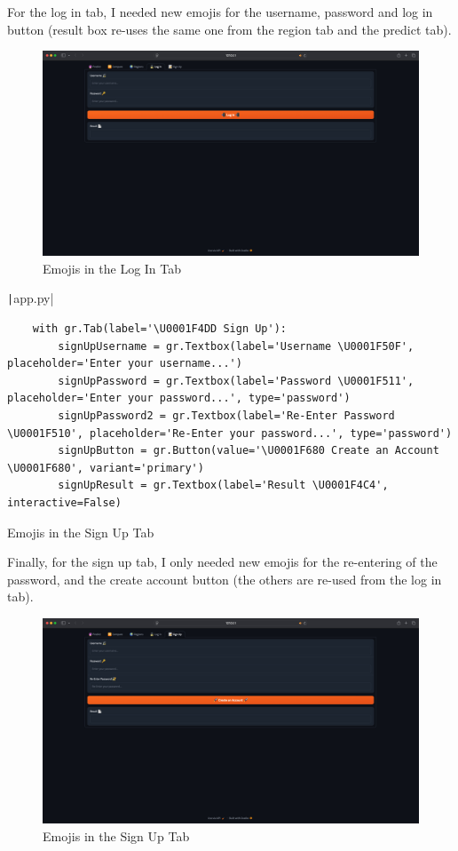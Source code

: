 \documentclass[12pt]{report}
\newcommand{\pil}[1]{\protect\texttt|#1|}
\begin{document}
For the log in tab, I needed new emojis for the username, password and log in button (result box re-uses the same one from the region tab and the predict tab).

\begin{figure}[H]
\centering
\includegraphics[width=14cm]{ss22.11.png}
\caption{Emojis in the Log In Tab}\label{fig:ss22.11}
\end{figure}

\begin{listing}[H]
\pil{app.py}
\begin{verbatim}
    with gr.Tab(label='\U0001F4DD Sign Up'):
        signUpUsername = gr.Textbox(label='Username \U0001F50F', placeholder='Enter your username...')
        signUpPassword = gr.Textbox(label='Password \U0001F511', placeholder='Enter your password...', type='password')
        signUpPassword2 = gr.Textbox(label='Re-Enter Password \U0001F510', placeholder='Re-Enter your password...', type='password')
        signUpButton = gr.Button(value='\U0001F680 Create an Account \U0001F680', variant='primary')
        signUpResult = gr.Textbox(label='Result \U0001F4C4', interactive=False)
\end{verbatim}
\caption{Emojis in the Sign Up Tab}\label{cs:emojis6}
\end{listing}

Finally, for the sign up tab, I only needed new emojis for the re-entering of the password, and the create account button (the others are re-used from the log in tab). 

\begin{figure}[H]
\centering
\includegraphics[width=14cm]{ss22.12.png}
\caption{Emojis in the Sign Up Tab}\label{fig:ss22.12}
\end{figure}
\end{document}
